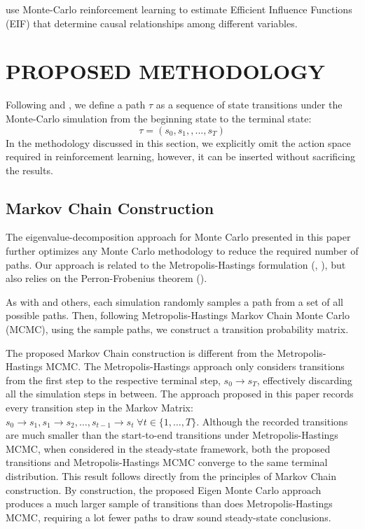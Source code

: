 \documentclass{wscpaperproc}
\theoremstyle{wsc}
\begin{document}
 use Monte-Carlo reinforcement learning to estimate Efficient Influence Functions (EIF) that determine causal relationships among different variables. 


\section{PROPOSED METHODOLOGY}

Following  and , we define a path $\mathcal{\tau}$ as a sequence of state transitions under the Monte-Carlo simulation from the beginning state to the terminal state:
\begin{equation}
    \tau=(s_0, s_1, ,...,s_T)
\end{equation}
In the methodology discussed in this section, we explicitly omit the action space required in reinforcement learning, however, it can be inserted without sacrificing the results. 


\subsection{Markov Chain Construction}

The eigenvalue-decomposition approach for Monte Carlo presented in this paper further optimizes any Monte Carlo methodology to reduce the required number of paths. Our approach is related to the Metropolis-Hastings formulation (, ), but also relies on the Perron-Frobenius theorem ().  

As with  and others, each simulation randomly samples a path from a set of all possible paths. Then, following Metropolis-Hastings Markov Chain Monte Carlo (MCMC), using the sample paths, we construct a transition probability matrix. 

The proposed Markov Chain construction is different from the Metropolis-Hastings MCMC. The Metropolis-Hastings approach only considers transitions from the first step to the respective terminal step, $s_0 \to s_T$, effectively discarding all the simulation steps in between. The approach proposed in this paper records every transition step in the Markov Matrix: $s_0\to s_1, s_1\to s_2,\dots, s_{t-1}\to s_t\;\forall t\in\{1,\dots,T\}$. Although the recorded transitions are much smaller than the start-to-end transitions under Metropolis-Hastings MCMC, when considered in the steady-state framework, both the proposed transitions and Metropolis-Hastings MCMC converge to the same terminal distribution. This result follows directly from the principles of Markov Chain construction. By construction, the proposed Eigen Monte Carlo approach produces a much larger sample of transitions than does Metropolis-Hastings MCMC, requiring a lot fewer paths to draw sound steady-state conclusions. 
\end{document}
